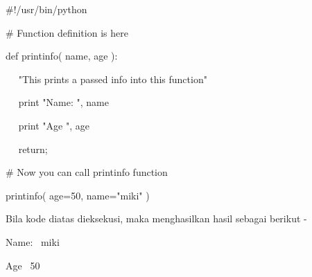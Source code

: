 \documentclass[a4paper,12pt]{report}
\begin{document}
 \par
\noindent 
 \hspace*{0.5in}  $  \#  $!/usr/bin/python \par
\vspace{12pt}
\noindent 
 \hspace*{0.5in}  $  \#  $ Function definition is here \par
\noindent 
 \hspace*{0.5in} def printinfo( name, age ): \par
\noindent 
 \hspace*{0.5in} ~~ "This prints a passed info into this function" \par
\noindent 
 \hspace*{0.5in} ~~ print "Name: ", name \par
\noindent 
 \hspace*{0.5in} ~~ print "Age ", age \par
\noindent 
 \hspace*{0.5in} ~~ return; \par
\vspace{12pt}
\noindent 
 \hspace*{0.5in}  $  \#  $ Now you can call printinfo function \par
\noindent 
 \hspace*{0.5in} printinfo( age=50, name="miki" ) \par
\begin{adjustwidth}{0.03in}{0.03in}
Bila kode diatas dieksekusi, maka menghasilkan hasil sebagai berikut -\end{adjustwidth}
 \par
\noindent 
 \hspace*{0.5in} Name:~ miki \par
\noindent 
 \hspace*{0.5in} Age~ 50 \par
\vspace{20pt}
\end{document}
